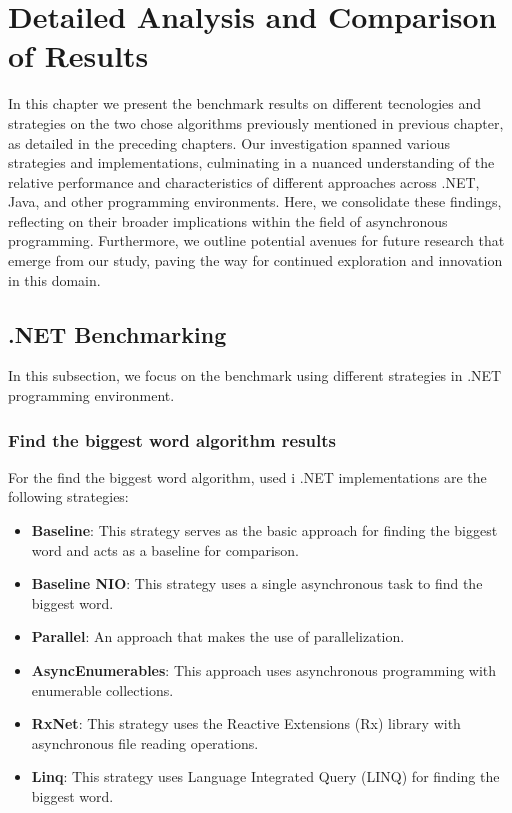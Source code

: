 
\chapter{Detailed Analysis and Comparison of Results}
\label{cha:conclusions_future_directions}
In this chapter we present the benchmark results on different tecnologies and strategies on the two chose algorithms previously mentioned in previous chapter, as detailed in the preceding chapters. Our investigation spanned various strategies and implementations, culminating in a nuanced understanding of the relative performance and characteristics of different approaches across .NET, Java, and other programming environments. Here, we consolidate these findings, reflecting on their broader implications within the field of asynchronous programming. Furthermore, we outline potential avenues for future research that emerge from our study, paving the way for continued exploration and innovation in this domain.


\section{.NET Benchmarking}
\label{sec:dotnet_implementation}

In this subsection, we focus on the benchmark using different strategies in .NET programming environment.


\subsection{Find the biggest word algorithm results}
\label{subsubsec:biggest_word_results_cs}

For the find the biggest word algorithm, used i .NET implementations are the following strategies:

\begin{itemize}
    \item \textbf{Baseline}: This strategy serves as the basic approach for finding the biggest word and acts as a baseline for comparison.
    \item \textbf{Baseline NIO}: This strategy uses a single asynchronous task to find the biggest word.
    \item \textbf{Parallel}: An approach that makes the use of parallelization.
    \item \textbf{AsyncEnumerables}: This approach uses asynchronous programming with enumerable collections.
    \item \textbf{RxNet}: This strategy uses the Reactive Extensions (Rx) library with asynchronous file reading operations.
    \item \textbf{Linq}: This strategy uses Language Integrated Query (LINQ) for finding the biggest word.
\end{itemize}



